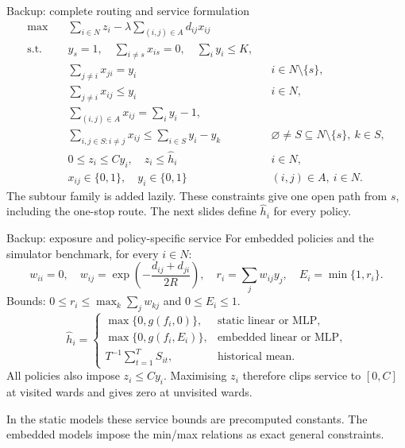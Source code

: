 \begin{frame}{Backup: complete routing and service formulation}
  \small
  \[
  \begin{aligned}
    \max\quad &\sum\nolimits_{i\in N}z_i-\lambda\sum\nolimits_{(i,j)\in A}d_{ij}x_{ij}\\
    \text{s.t.}\quad &y_s=1,\quad \sum\nolimits_{i\ne s}x_{is}=0,\quad \sum\nolimits_i y_i\le K,\\
    &\sum\nolimits_{j\ne i}x_{ji}=y_i && i\in N\setminus\{s\},\\
    &\sum\nolimits_{j\ne i}x_{ij}\le y_i && i\in N,\\
    &\sum\nolimits_{(i,j)\in A}x_{ij}=\sum\nolimits_i y_i-1,\\
    &\sum\nolimits_{i,j\in S:i\ne j}x_{ij}\le\sum\nolimits_{i\in S}y_i-y_k
      &&\varnothing\ne S\subseteq N\setminus\{s\},\ k\in S,\\
    &0\le z_i\le Cy_i,\quad z_i\le\widehat h_i &&i\in N,\\
    &x_{ij}\in\{0,1\},\quad y_i\in\{0,1\} &&(i,j)\in A,\ i\in N.
  \end{aligned}
  \]
  \footnotesize The subtour family is added lazily. These constraints give one open path from $s$, including the one-stop route. The next slides define $\widehat h_i$ for every policy.
\end{frame}

\begin{frame}{Backup: exposure and policy-specific service}
  \small
  For embedded policies and the simulator benchmark, for every $i\in N$:
  \[
    w_{ii}=0,\quad w_{ij}=\exp\!\left(-\frac{d_{ij}+d_{ji}}{2R}\right),\quad
    r_i=\sum_jw_{ij}y_j,\quad E_i=\min\{1,r_i\}.
  \]
  Bounds: $0\le r_i\le\max_k\sum_jw_{kj}$ and $0\le E_i\le1$.
  \[
    \widehat h_i=\begin{cases}
      \max\{0,g(f_i,0)\}, &\text{static linear or MLP},\\[1mm]
      \max\{0,g(f_i,E_i)\}, &\text{embedded linear or MLP},\\[1mm]
      T^{-1}\sum_{t=1}^T S_{it}, &\text{historical mean}.
    \end{cases}
  \]
  All policies also impose $z_i\le Cy_i$. Maximising $z_i$ therefore clips service to $[0,C]$ at visited wards and gives zero at unvisited wards.
  \par\vspace{3mm}
  In the static models these service bounds are precomputed constants. The embedded models impose the min/max relations as exact general constraints.
\end{frame}

